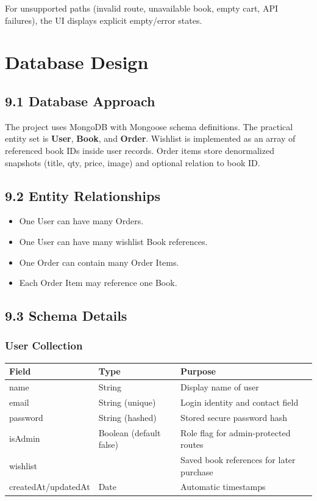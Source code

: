 \documentclass[12pt,a4paper]{report}
\begin{document}
For unsupported paths (invalid route, unavailable book, empty cart, API failures), the UI displays explicit empty/error states.

\chapter{Database Design}
\section*{9.1 Database Approach}
The project uses MongoDB with Mongoose schema definitions. The practical entity set is \textbf{User}, \textbf{Book}, and \textbf{Order}. Wishlist is implemented as an array of referenced book IDs inside user records. Order items store denormalized snapshots (title, qty, price, image) and optional relation to book ID.

\section*{9.2 Entity Relationships}
\begin{itemize}
    \item One User can have many Orders.
    \item One User can have many wishlist Book references.
    \item One Order can contain many Order Items.
    \item Each Order Item may reference one Book.
\end{itemize}

\section*{9.3 Schema Details}
\subsection*{User Collection}
\begin{longtable}{>{\raggedright\arraybackslash}p{} >{\raggedright\arraybackslash}p{} >{\raggedright\arraybackslash}p{}}
\toprule
\textbf{Field} & \textbf{Type} & \textbf{Purpose} \\
\midrule
name & String & Display name of user \\
email & String (unique) & Login identity and contact field \\
password & String (hashed) & Stored secure password hash \\
isAdmin & Boolean (default false) & Role flag for admin-protected routes \\
wishlist & [ObjectId $\rightarrow$ Book] & Saved book references for later purchase \\
createdAt/updatedAt & Date & Automatic timestamps \\
\bottomrule
\end{longtable}
\end{document}

